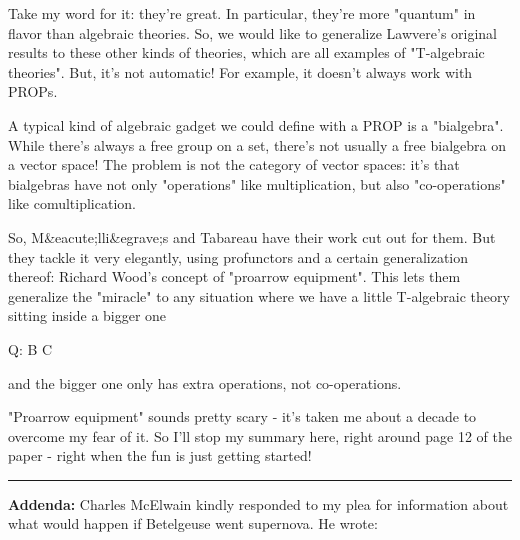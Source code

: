Take my word for it: they're great.  In particular, they're more
"quantum" in flavor than algebraic theories.  So, we would like to
generalize Lawvere's original results to these other kinds of
theories, which are all examples of "T-algebraic theories".  But, it's
not automatic!  For example, it doesn't always work with PROPs.

A typical kind of algebraic gadget we could define with a PROP is a
"bialgebra".  While there's always a free group on a set,
there's not usually a free bialgebra on a vector space!  The problem
is not the category of vector spaces: it's that bialgebras have not
only "operations" like multiplication, but also
"co-operations" like comultiplication.  

So, M&eacute;lli&egrave;s and Tabareau have their work cut out for
them.  But they tackle it very elegantly, using profunctors and a
certain generalization thereof: Richard Wood's concept of
"proarrow equipment".  This lets them generalize the
"miracle" to any situation where we have a little
T-algebraic theory sitting inside a bigger one

Q: B \to  C

and the bigger one only has extra operations, not co-operations.

"Proarrow equipment" sounds pretty scary - it's taken me about a
decade to overcome my fear of it.  So I'll stop my summary here, right
around page 12 of the paper - right when the fun is just getting
started!  

\par\noindent\rule{\textwidth}{0.4pt}

\textbf{Addenda:} Charles McElwain kindly responded to my plea for
information about what would happen if Betelgeuse went supernova.  He
wrote:

